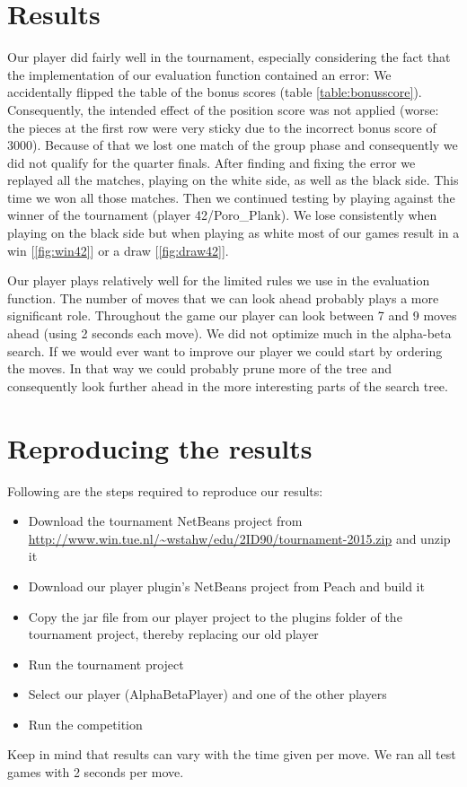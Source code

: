 \documentclass[11pt,a4paper]{article}
\begin{document}
\section{Results}
Our player did fairly well in the tournament, especially considering the fact that the implementation of our evaluation function contained an error: We accidentally flipped the table of the bonus scores (table \ref{table:bonusscore}). Consequently, the intended effect of the position score was not applied (worse: the pieces at the first row were very sticky due to the incorrect bonus score of 3000).
Because of that we lost one match of the group phase and consequently we did not qualify for the quarter finals. After finding and fixing the error we replayed all the matches, playing on the white side, as well as the black side. This time we won all those matches. Then we continued testing by playing against the winner of the tournament (player 42/Poro\_Plank). We lose consistently when playing on the black side but when playing as white most of our games result in a win [\ref{fig:win42}] or a draw [\ref{fig:draw42}].

Our player plays relatively well for the limited rules we use in the evaluation function. The number of moves that we can look ahead probably plays a more significant role. Throughout the game our player can look between 7 and 9 moves ahead (using 2 seconds each move). We did not optimize much in the alpha-beta search. If we would ever want to improve our player we could start by ordering the moves. In that way we could probably prune more of the tree and consequently look further ahead in the more interesting parts of the search tree.

\section{Reproducing the results}
Following are the steps required to reproduce our results:
\begin{itemize}
\item Download the tournament NetBeans project from \url{http://www.win.tue.nl/~wstahw/edu/2ID90/tournament-2015.zip} and unzip it
\item Download our player plugin's NetBeans project from Peach and build it
\item Copy the jar file from our player project to the plugins folder of the tournament project, thereby replacing our old player
\item Run the tournament project
\item Select our player (AlphaBetaPlayer) and one of the other players
\item Run the competition
\end{itemize}
Keep in mind that results can vary with the time given per move. We ran all test games with 2 seconds per move.
\end{document}
